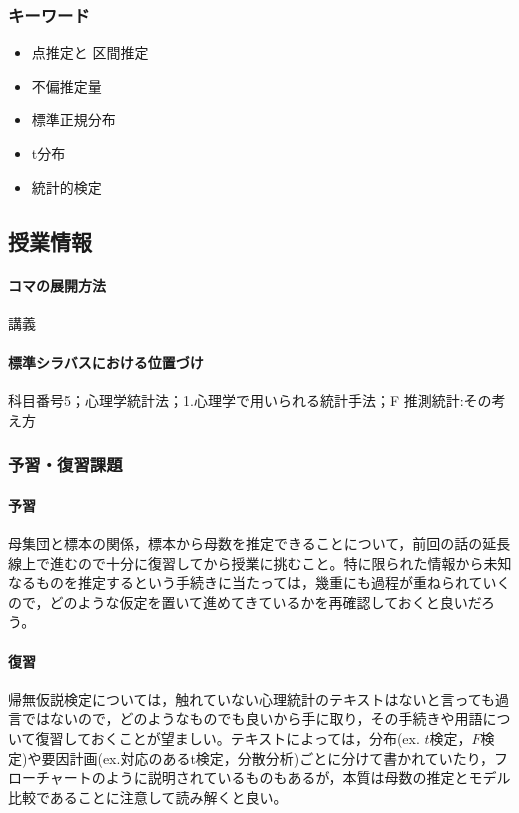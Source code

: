 \subsubsection{キーワード}
\begin{itemize}
\item 点推定と 区間推定
\item 不偏推定量
\item 標準正規分布
\item t分布
\item 統計的検定
\end{itemize}
\subsection{授業情報}
\paragraph{コマの展開方法}
講義
\paragraph{標準シラバスにおける位置づけ}
科目番号5；心理学統計法；1.心理学で用いられる統計手法；F 推測統計:その考え方
\subsubsection{予習・復習課題}
\paragraph{予習}
母集団と標本の関係，標本から母数を推定できることについて，前回の話の延長線上で進むので十分に復習してから授業に挑むこと。特に限られた情報から未知なるものを推定するという手続きに当たっては，幾重にも過程が重ねられていくので，どのような仮定を置いて進めてきているかを再確認しておくと良いだろう。
\paragraph{復習}
帰無仮説検定については，触れていない心理統計のテキストはないと言っても過言ではないので，どのようなものでも良いから手に取り，その手続きや用語について復習しておくことが望ましい。テキストによっては，分布(ex. $t$検定，$F$検定)や要因計画(ex.対応のあるt検定，分散分析)ごとに分けて書かれていたり，フローチャートのように説明されているものもあるが，本質は母数の推定とモデル比較であることに注意して読み解くと良い。
